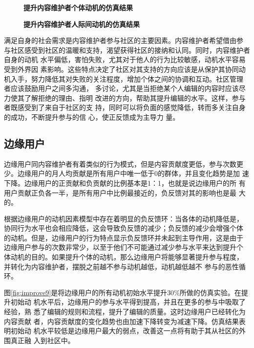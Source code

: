\begin{figure}[!htb]
  \centering
  
  \caption{\small{\textbf{提升内容维护者个体动机的仿真结果}}}
  \label{fig:improve7}
\end{figure}

\begin{figure}[!htb]
  \centering
  
  \caption{\small{\textbf{提升内容维护者人际间动机的仿真结果}}}
  \label{fig:improve8}
\end{figure}
满足自身的社会需求是内容维护者参与社区的主要因素。内容维护者希望借由参
与社区感受到社区的温暖和支持，渴望获得社区的接纳和认同。同时，内容维护者自身的动机
水平偏低，害怕失败，尤其对于他人的行为比较敏感，动机水平容易受到外界因
素影响。这些特点决定了社区对其支持的方向应该是从保护其协同动
机入手，努力降低其对失败的关注程度，增加个体之间的协调和互动。社区管理
者应该鼓励用户之间多沟通，
多讨论，尤其是当拒绝某个人编辑的内容时应该尽力使其了解拒绝的理由、指明
改进的方向，帮助其提升编辑的水平。这样，参与者既感受到了来自于社区的支
持，同时可以将负面的感觉降低，转而多关注自身的成功，不断提升参与的信
心，使正反馈成为主导力
量。

\subsection{边缘用户}
边缘用户同内容维护者有着类似的行为模式，但是内容贡献度更低，参与次数更
少。边缘用户的月人均贡献是所有用户中唯一低于0的群体，并且变化趋势是加
速下降。边缘用户的正贡献和负贡献的比例基本是1：1，也就是说边缘用户的所
有用户贡献正负各一半，是所有用户中比例最接近的，负反馈对其的影响也是最
大的。

根据边缘用户的动机因素模型中存在着明显的负反馈环：当各体的动机降低是，
协同行为水平也会相应降低，这会导致负反馈的减少；负反馈的减少会增强个体
的动机。但是，边缘用户的行为特点显示负反馈环并未起到主导作用，这是由于
边缘用户参与的次数非常少，以至于他们不可能通过减少参与水平来达到提升个
体动机的目的。如果提升个体的动机，那么边缘用户将能够显著提升参与程度，
并转化为内容维护者，摆脱之前越不参与动机越低，动机越低越不
参与的恶性循环。

图\ref{fig:improve9}是将边缘用户的所有动机初始水平提升$30\%$所做的仿真实验。在提升初始动
机水平后，边缘用户的参与水平得到提高，并且在更多的参与中吸取了经验，熟
悉了编辑的规则和流程，提升了编辑的质量。这时边缘用户已经转化为内容贡献
者，内容贡献度的变化趋势也由加速下降转变为减速下降。仿真结果表明初始动
机水平较低是边缘用户最大的弱点，改善这一点将有助于其从社区的外围真正融
入到社区中。

